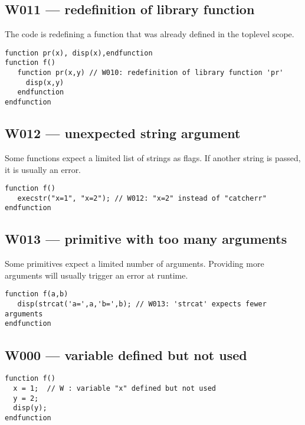 \subsection{W011 --- redefinition of library function}




The code is redefining a function that was already defined in the toplevel scope.

\begin{verbatim}
function pr(x), disp(x),endfunction
function f()
   function pr(x,y) // W010: redefinition of library function 'pr'
     disp(x,y)
   endfunction
endfunction

\end{verbatim}


\subsection{W012 --- unexpected string argument}




Some functions expect a limited list of strings as flags. If another string is passed, it is usually an error.

\begin{verbatim}
function f()
   execstr("x=1", "x=2"); // W012: "x=2" instead of "catcherr"
endfunction
\end{verbatim}


\subsection{W013 --- primitive with too many arguments}




Some primitives expect a limited number of arguments. Providing more arguments will usually trigger an error at runtime.

\begin{verbatim}
function f(a,b)
   disp(strcat('a=',a,'b=',b); // W013: 'strcat' expects fewer arguments
endfunction
\end{verbatim}


\subsection{W000 --- variable defined but not used}


\begin{verbatim}
function f()
  x = 1;  // W : variable "x" defined but not used
  y = 2;
  disp(y);
endfunction
\end{verbatim}


